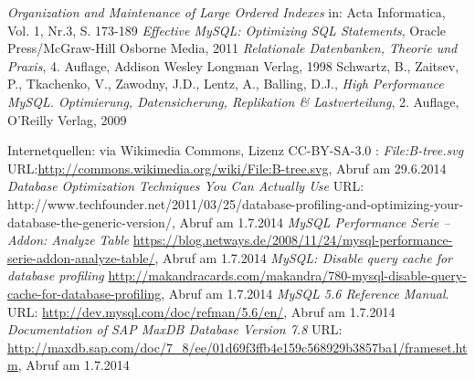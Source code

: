 \newpage
{}
  \begin{thebibliography}{}



	 {\sl Organization and Maintenance of Large Ordered Indexes}
	     in: Acta Informatica, Vol. 1, Nr.3, S. 173-189
     {\sl Effective MySQL: Optimizing SQL Statements}, Oracle Press/McGraw-Hill Osborne Media, 2011
     {\sl Relationale Datenbanken, Theorie und Praxis}, 4. Auflage, Addison Wesley Longman Verlag, 1998
     Schwartz, B., Zaitsev, P., Tkachenko, V., Zawodny, J.D., Lentz, A., Balling, D.J., {\sl High Performance MySQL. Optimierung, Datensicherung, Replikation \& Lastverteilung}, 2. Auflage,  O'Reilly Verlag, 2009
	
	Internetquellen:
	 via Wikimedia Commons, Lizenz CC-BY-SA-3.0 : {\sl File:B-tree.svg} URL:\url{http://commons.wikimedia.org/wiki/File:B-tree.svg}, Abruf am 29.6.2014
	 {\sl Database Optimization Techniques You Can Actually Use} URL: {http://www.techfounder.net/2011/03/25/database-profiling-and-optimizing-your-database-the-generic-version/}, Abruf am 1.7.2014
	 {\sl MySQL Performance Serie – Addon: Analyze Table} \url{https://blog.netways.de/2008/11/24/mysql-performance-serie-addon-analyze-table/}, Abruf am 1.7.2014
	 {\sl MySQL: Disable query cache for database profiling} \url{http://makandracards.com/makandra/780-mysql-disable-query-cache-for-database-profiling}, Abruf am 1.7.2014
	 {\sl MySQL 5.6 Reference Manual}. URL: 
	\url{http://dev.mysql.com/doc/refman/5.6/en/}, Abruf am 1.7.2014
	 {\sl Documentation of SAP MaxDB Database Version 7.8} URL: \url{http://maxdb.sap.com/doc/7_8/ee/01d69f3ffb4e159c568929b3857ba1/frameset.htm}, Abruf am 1.7.2014

  \end{thebibliography}
